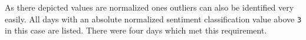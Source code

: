 
As there depicted values are normalized ones outliers can also be identified very easily.
All days with an absolute normalized sentiment classification value above \texttt{3} in this case are listed.
There were four days which met this requirement.

